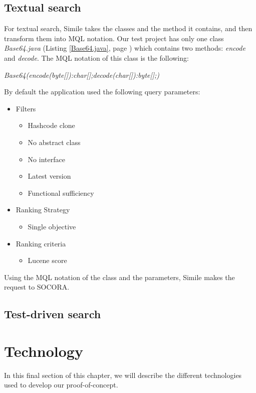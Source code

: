\subsection{Textual search}
For textual search, Simile takes the classes and the method it contains, and then transform them into MQL notation. Our test project has only one class \emph{Base64.java} (Listing \ref{Base64.java}, page \pageref{Base64.java}) which contains two methods: \emph{encode} and \emph{decode}. The MQL notation of this class is the following:

\begin{displayquote}
\emph{Base64(encode(byte[]):char[];decode(char[]):byte[];)}
\end{displayquote}

By default the application used the following query parameters:

\begin{itemize}
\item Filters
	\begin{itemize}
	\item Hashcode clone
	\item No abstract class
	\item No interface
	\item Latest version
	\item Functional sufficiency
	\end{itemize}
\item Ranking Strategy
	\begin{itemize}
	\item Single objective
	\end{itemize}
\item Ranking criteria
	\begin{itemize}
	\item Lucene score
	\end{itemize}
\end{itemize}

Using the MQL notation of the class and the parameters, Simile makes the request to SOCORA.
\subsection{Test-driven search}

\section{Technology}
In this final section of this chapter, we will describe the different technologies used to develop our proof-of-concept.

